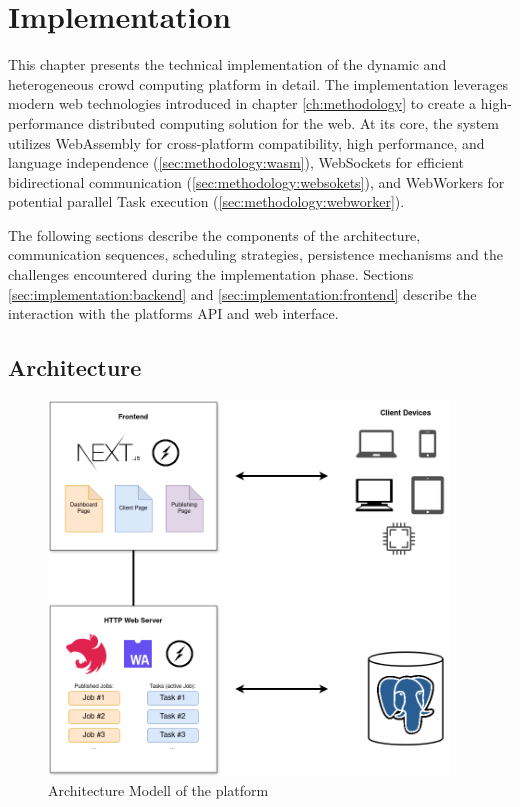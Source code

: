 \chapter{Implementation}
\label{ch:implementation}
This chapter presents the technical implementation of the dynamic and heterogeneous crowd computing platform in detail. The implementation leverages modern web technologies introduced in chapter \ref{ch:methodology} to create a high-performance distributed computing solution for the web. At its core, the system utilizes WebAssembly for cross-platform compatibility, high performance, and language independence (\ref{sec:methodology:wasm}), WebSockets for efficient bidirectional communication (\ref{sec:methodology:websokets}), and WebWorkers for potential parallel Task execution (\ref{sec:methodology:webworker}).

The following sections describe the components of the architecture, communication sequences, scheduling strategies, persistence mechanisms and the challenges encountered during the implementation phase. Sections \ref{sec:implementation:backend} and \ref{sec:implementation:frontend} describe the interaction with the platforms API and web interface.

\section{Architecture}
\label{sec:implementation:architecture}
\begin{figure}[htbp]
    \centering
    \includegraphics[width=0.95\textwidth]{gfx/figures/WebAssembly-MA.png}
    \caption{Architecture Modell of the platform}
    \label{fig:implementation:architecture}
\end{figure}

